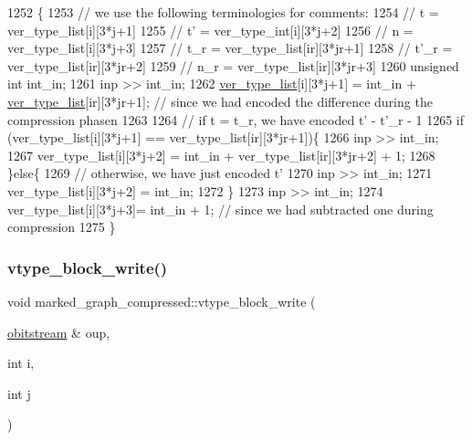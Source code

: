 \begin{DoxyCode}
1252                                                                                            \{
1253   \textcolor{comment}{// we use the following terminologies for comments:}
1254   \textcolor{comment}{// t = ver\_type\_list[i][3*j+1]}
1255   \textcolor{comment}{// t' = ver\_type\_int[i][3*j+2]}
1256   \textcolor{comment}{// n = ver\_type\_list[i][3*j+3]}
1257   \textcolor{comment}{// t\_r = ver\_type\_list[ir][3*jr+1]}
1258   \textcolor{comment}{// t'\_r = ver\_type\_list[ir][3*jr+2]}
1259   \textcolor{comment}{// n\_r = ver\_type\_list[ir][3*jr+3]}
1260   \textcolor{keywordtype}{unsigned} \textcolor{keywordtype}{int} int\_in;
1261   inp >> int\_in;
1262   \hyperlink{classmarked__graph__compressed_af2e3e55223d436628a02758dfae88493}{ver\_type\_list}[i][3*j+1] = int\_in + \hyperlink{classmarked__graph__compressed_af2e3e55223d436628a02758dfae88493}{ver\_type\_list}[ir][3*jr+1]; \textcolor{comment}{// since we had
       encoded the difference during the compression phasen}
1263  
1264   \textcolor{comment}{// if t = t\_r, we have encoded t' - t'\_r - 1}
1265   \textcolor{keywordflow}{if} (ver\_type\_list[i][3*j+1] == ver\_type\_list[ir][3*jr+1])\{
1266     inp >> int\_in;
1267     ver\_type\_list[i][3*j+2] = int\_in + ver\_type\_list[ir][3*jr+2] + 1;
1268   \}\textcolor{keywordflow}{else}\{
1269     \textcolor{comment}{// otherwise, we have just encoded t'}
1270     inp >> int\_in;
1271     ver\_type\_list[i][3*j+2] = int\_in;
1272   \}
1273   inp >> int\_in;
1274   ver\_type\_list[i][3*j+3]= int\_in + 1; \textcolor{comment}{// since we had subtracted one during compression}
1275 \}
\end{DoxyCode}
\mbox{\label{classmarked__graph__compressed_a31f9ea72682f9072d0f90faf58a603fe}} 
\subsubsection{\texorpdfstring{vtype\+\_\+block\+\_\+write()}{vtype\_block\_write()}\hspace{0.1cm}{\footnotesize\ttfamily [1/2]}}
{\footnotesize\ttfamily void marked\+\_\+graph\+\_\+compressed\+::vtype\+\_\+block\+\_\+write (\begin{DoxyParamCaption}\item[{\hyperlink{classobitstream}{obitstream} \&}]{oup,  }\item[{int}]{i,  }\item[{int}]{j }\end{DoxyParamCaption})}

